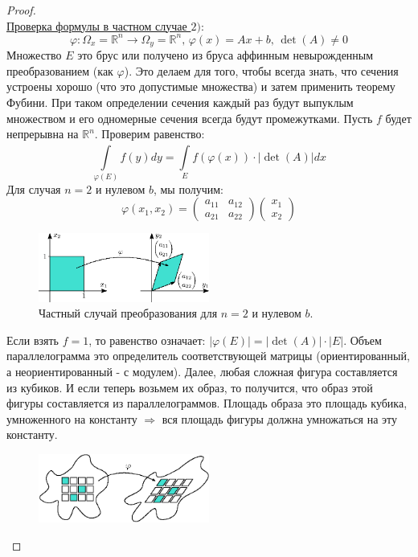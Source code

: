 \documentclass[12pt]{article}
\newcommand{\MR}{\mathbb{R}}
\theoremstyle{definition}
\newcommand{\ddint}[2]{\displaystyle\int\limits_{#1}^{#2}}
\begin{document}
\begin{proof}\hfill\\	
	\uline{Проверка формулы в частном случае $2)$}:	
	$$
		\varphi \colon \Omega_x = \MR^n \to \Omega_y =\MR^n, \, \varphi(x) = Ax + b, \, \det(A) \neq 0
	$$
	Множество $E$ это брус или получено из бруса аффинным невырожденным преобразованием (как $\varphi$). Это делаем для того, чтобы всегда знать, что сечения устроены хорошо (что это допустимые множества) и затем применить теорему Фубини. При таком определении сечения каждый раз будут выпуклым множеством и его одномерные сечения всегда будут промежутками. Пусть $f$ будет непрерывна на $\MR^n$. Проверим равенство:
	$$
		\ddint{\varphi(E)}{}f(y)dy = \ddint{E}{}f(\varphi(x)){\cdot}|\det{(A)}|dx
	$$
	Для случая $n = 2$ и нулевом $b$, мы получим:
	$$
		\varphi(x_1,x_2) = 
		\begin{pmatrix}
			a_{11} & a_{12}\\
			a_{21} & a_{22}
		\end{pmatrix}
		\begin{pmatrix}
			x_1 \\
			x_2
		\end{pmatrix}
	$$
	\begin{figure}[H]
		\centering
		\includegraphics[width=0.5\textwidth]{MA4L6_3.eps}
		\caption{Частный случай преобразования для $n = 2$ и нулевом $b$.}
		\label{6_3}
	\end{figure}
	Если взять $f = 1$, то равенство означает: $|\varphi(E)| = |\det{(A)}|{\cdot}|E|$. Объем параллелограмма это определитель соответствующей матрицы (ориентированный, а неориентированный - с модулем). Далее, любая сложная фигура составляется из кубиков. И если теперь возьмем их образ, то получится, что образ этой фигуры составляется из параллелограммов. Площадь образа это площадь кубика, умноженного на константу $\Rightarrow$ вся площадь фигуры должна умножаться на эту константу. 
	\begin{figure}[H]
		\centering
		\includegraphics[width=0.5\textwidth]{MA4L6_4.eps}

\end{figure}
\end{proof}
\end{document}

